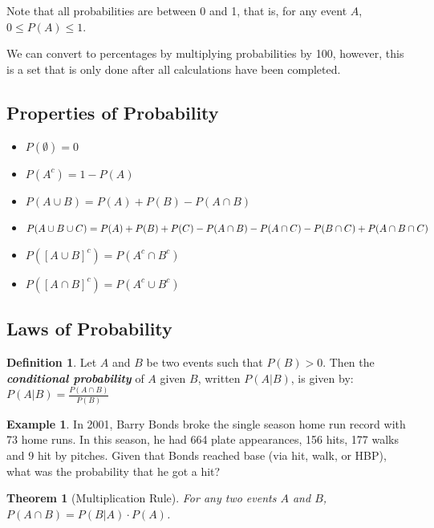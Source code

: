 \documentclass[
  11pt,
]{book}
\newtheorem{theorem}{Theorem}[chapter]
\theoremstyle{definition}
\newtheorem{definition}{Definition}[chapter]
\theoremstyle{definition}
\newtheorem{example}{Example}[chapter]
\theoremstyle{definition}
\theoremstyle{definition}
\theoremstyle{remark}
\begin{document}
Note that all probabilities are between 0 and 1, that is, for any event \(A\), \(0 \leq P(A) \leq 1\).

We can convert to percentages by multiplying probabilities by 100, however, this is a set that is only done after all calculations have been completed.

\hypertarget{properties-of-probability}{%
\subsection{Properties of Probability}\label{properties-of-probability}}

\begin{itemize}
\item
  \(P(\emptyset) = 0\)\\
\item
  \(P(A^c) = 1 - P(A)\)
\item
  \(P(A \cup B) = P(A) + P(B) - P(A \cap B)\)
\item
  \(P(A \cup B \cup C) = \\ P(A) + P(B) + P(C) - P(A \cap B) - P(A \cap C) - P(B \cap C) + P(A \cap B \cap C)\)
\item
  \(P([A \cup B]^c) = P(A^c \cap B^c)\)
\item
  \(P([A \cap B]^c) = P(A^c \cup B^c)\)
\end{itemize}

\hypertarget{laws-of-probability}{%
\subsection{Laws of Probability}\label{laws-of-probability}}

\begin{definition}
Let \(A\) and \(B\) be two events such that \(P(B)>0\). Then the \textbf{\emph{conditional probability}} of \(A\) given \(B\), written \(P(A|B)\), is given by:
\(P(A|B) = \frac{P(A \cap B)}{P(B)}\)
\end{definition}

\begin{example}
In 2001, Barry Bonds broke the single season home run record with 73 home runs. In this season, he had 664 plate appearances, 156 hits, 177 walks and 9 hit by pitches. Given that Bonds reached base (via hit, walk, or HBP), what was the probability that he got a hit?
\end{example}

\hfill\break
\hfill\break
\hfill\break

\begin{theorem}[Multiplication Rule]
For any two events \(A\) and \(B\), \(P(A \cap B) = P(B|A) \cdot P(A)\).
\end{theorem}
\end{document}
